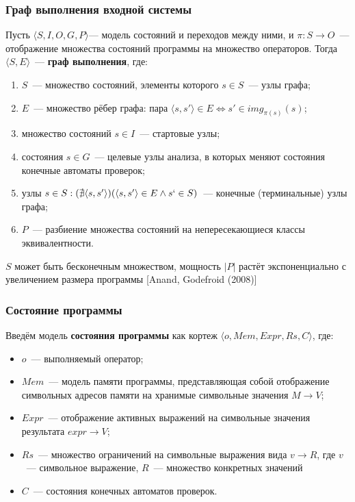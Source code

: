 \documentclass[10pt,gray]{beamer}
\begin{document}
\begin{frame}
\frametitle{Граф выполнения входной системы}
Пусть $\langle S, I, O, G, P\rangle$--- модель состояний и переходов между ними, и $\pi: S \rightarrow O$~--- отображение множества состояний программы на множество операторов. Тогда $\langle S, E\rangle $~--- \textbf{граф выполнения}, где:
\begin{enumerate}
 \item $S$~--- множество состояний, элементы которого $s \in S$~--- узлы графа;
 \item $E$~--- множество рёбер графа: пара $\langle s, s'\rangle \in E \Leftrightarrow s' \in img_{\pi(s)}(s)$;
 \item множество состояний $s \in I$~--- стартовые узлы;
 \item состояния $s \in G$~--- целевые узлы анализа, в которых меняют состояния конечные автоматы проверок;
 \item узлы $s \in S: (\nexists \langle s, s' \rangle )(\langle s, s' \rangle \in E \wedge s` \in S)$~--- конечные (терминальные) узлы графа;
 \item $P$~--- разбиение множества состояний на непересекающиеся классы эквивалентности.
\end{enumerate}

$S$ может быть бесконечным множеством, мощность $|P|$ растёт экспоненциально с увеличением размера программы [Anand, Godefroid (2008)]
\end{frame}


\begin{frame}
\frametitle{Состояние программы}

Введём модель \textbf{состояния программы} как кортеж $\langle o, Mem, Expr, Rs, C \rangle$, где:
\begin{itemize}
 \item $o$~--- выполняемый оператор;
 \item $Mem$~--- модель памяти программы, представляющая собой отображение символьных адресов памяти на хранимые символьные значения $M \rightarrow V$;
 \item $Expr$~--- отображение активных выражений на символьные значения результата $expr \rightarrow V$;
 \item $Rs$~--- множество ограничений на символьные выражения вида $v \rightarrow R$, где $v$~--- символьное выражение, $R$~--- множество конкретных значений
 \item $C$~--- состояния конечных автоматов проверок.
\end{itemize}

\end{frame}
\end{document}
